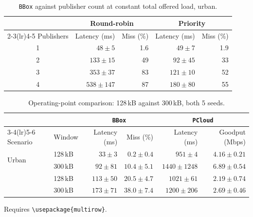 \begin{table}[htbp]
  \centering
  \caption{\texttt{BBox} against publisher count at constant total offered load, urban.}
  \label{tab:pubscale}
  \begin{tabular}{@{}crrrr@{}}
    \toprule
    & \multicolumn{2}{c}{Round-robin} & \multicolumn{2}{c}{Priority} \\
    \cmidrule(lr){2-3}\cmidrule(lr){4-5}
    Publishers & Latency (ms) & Miss (\%) & Latency (ms) & Miss (\%) \\
    \midrule
    1 & $48 \pm 5$    & 1.6 & $49 \pm 7$   & 1.9 \\
    2 & $133 \pm 15$  & 49  & $92 \pm 45$  & 33 \\
    3 & $353 \pm 37$  & 83  & $121 \pm 10$ & 52 \\
    4 & $538 \pm 147$ & 87  & $180 \pm 80$ & 55 \\
    \bottomrule
  \end{tabular}
\end{table}


\begin{table}[htbp]
  \centering
  \caption{Operating-point comparison: 128\,kB against 300\,kB, both 5 seeds.}
  \label{tab:oppoint}
  \begin{tabular}{@{}llrrrr@{}}
    \toprule
    & & \multicolumn{2}{c}{\texttt{BBox}} & \multicolumn{2}{c}{\texttt{PCloud}} \\
    \cmidrule(lr){3-4}\cmidrule(lr){5-6}
    Scenario & Window
      & Latency (ms) & Miss (\%) & Latency (ms) & Goodput (Mbps) \\
    \midrule
    \multirow{2}{*}{Urban}
      & 128\,kB & $33 \pm 3$  & $0.2 \pm 0.4$  & $951 \pm 4$    & $4.16 \pm 0.21$ \\
      & 300\,kB & $92 \pm 81$ & $10.4 \pm 5.1$ & $1440 \pm 1248$ & $6.89 \pm 0.54$ \\
    \addlinespace
    \multirow{2}{*}{Highway}
      & 128\,kB & $113 \pm 50$ & $20.5 \pm 4.7$ & $1021 \pm 61$  & $2.19 \pm 0.74$ \\
      & 300\,kB & $173 \pm 71$ & $38.0 \pm 7.4$ & $1200 \pm 206$ & $2.69 \pm 0.46$ \\
    \bottomrule
  \end{tabular}

  \smallskip
  \footnotesize
  Requires \texttt{\textbackslash usepackage\{multirow\}}.
\end{table}


